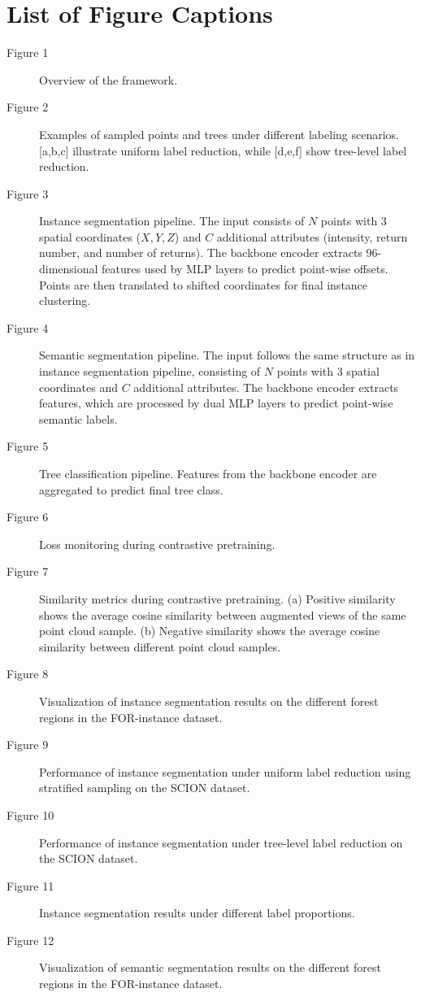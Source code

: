 \documentclass[review,authoryear]{elsarticle}
\begin{document}
\section*{List of Figure Captions}
\begin{description}
\item[Figure 1] Overview of the framework.
\item[Figure 2] Examples of sampled points and trees under different labeling scenarios. [a,b,c] illustrate uniform label reduction, while [d,e,f] show tree-level label reduction.
\item[Figure 3] Instance segmentation pipeline. The input consists of $N$ points with 3 spatial coordinates ($X,Y,Z$) and $C$ additional attributes (intensity, return number, and number of returns). The backbone encoder extracts 96-dimensional features used by MLP layers to predict point-wise offsets. Points are then translated to shifted coordinates for final instance clustering.
\item[Figure 4] Semantic segmentation pipeline. The input follows the same structure as in instance segmentation pipeline, consisting of $N$ points with 3 spatial coordinates and $C$ additional attributes. The backbone encoder extracts features, which are processed by dual MLP layers to predict point-wise semantic labels.
\item[Figure 5] Tree classification pipeline. Features from the backbone encoder are aggregated to predict final tree class.
\item[Figure 6] Loss monitoring during contrastive pretraining.
\item[Figure 7] Similarity metrics during contrastive pretraining. (a) Positive similarity shows the average cosine similarity between augmented views of the same point cloud sample. (b) Negative similarity shows the average cosine similarity between different point cloud samples.
\item[Figure 8] Visualization of instance segmentation  results on the different forest regions in the FOR-instance dataset.
\item[Figure 9] Performance of instance segmentation under uniform label reduction using stratified sampling on the SCION dataset.
\item[Figure 10] Performance of instance segmentation under tree-level label reduction on the SCION dataset.
\item[Figure 11] Instance segmentation results under different label proportions.
\item[Figure 12] Visualization of semantic segmentation results on the different forest regions in the FOR-instance dataset.

\end{description}
\end{document}
